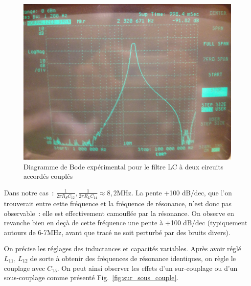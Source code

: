 \documentclass{article}
\begin{document}
\begin{figure}[h]
	\centering
	\includegraphics[width=.5\textwidth]{1MHz_100MHz}
	\caption{Diagramme de Bode expérimental pour le filtre LC à deux circuits accordés couplés}
	\label{fig:LC2plot}
\end{figure}

Dans notre cas~: ${\frac{1}{2\pi R_S C_{12}}, \frac{1}{2\pi R_L C_{14}}\approx 8,2\mathrm{MHz}}$. La pente +100 dB/dec, que l'on trouverait entre cette fréquence et la fréquence de résonance, n'est donc pas observable~: elle est effectivement camouflée par la résonance. On observe en revanche bien en deçà de cette fréquence une pente à +100 dB/dec (typiquement autours de 6-7MHz, avant que tracé ne soit perturbé par des bruits divers).


On précise les réglages des inductances et capacités variables. Après avoir réglé $L_{11}$, $L_{12}$ de sorte à obtenir des fréquences de résonance identiques, on règle le couplage avec $C_{15}$. On peut ainsi observer les effets d'un sur-couplage ou d'un sous-couplage comme présenté Fig.~\ref{fig:sur_sous_couple}.
\end{document}
